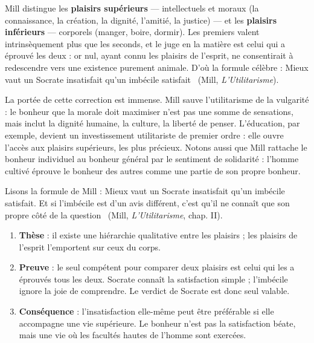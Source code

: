 \documentclass[11pt]{article}
\begin{document}
\begin{propriete}
Mill distingue les \textbf{plaisirs supérieurs} — intellectuels et moraux (la connaissance, la création, la dignité, l'amitié, la justice) — et les \textbf{plaisirs inférieurs} — corporels (manger, boire, dormir). Les premiers valent intrinsèquement plus que les seconds, et le juge en la matière est celui qui a éprouvé les deux : or nul, ayant connu les plaisirs de l'esprit, ne consentirait à redescendre vers une existence purement animale. D'où la formule célèbre : \guillemotleft Mieux vaut un Socrate insatisfait qu'un imbécile satisfait \guillemotright\ (Mill, \emph{L'Utilitarisme}).
\end{propriete}

La portée de cette correction est immense. Mill sauve l'utilitarisme de la vulgarité : le bonheur que la morale doit maximiser n'est pas une somme de sensations, mais inclut la dignité humaine, la culture, la liberté de penser. L'éducation, par exemple, devient un investissement utilitariste de premier ordre : elle ouvre l'accès aux plaisirs supérieurs, les plus précieux. Notons aussi que Mill rattache le bonheur individuel au bonheur général par le sentiment de solidarité : l'homme cultivé éprouve le bonheur des autres comme une partie de son propre bonheur.

\begin{experience}
Lisons la formule de Mill : \guillemotleft Mieux vaut un Socrate insatisfait qu'un imbécile satisfait. Et si l'imbécile est d'un avis différent, c'est qu'il ne connaît que son propre côté de la question \guillemotright\ (Mill, \emph{L'Utilitarisme}, chap. II).
\begin{enumerate}
\item \textbf{Thèse} : il existe une hiérarchie qualitative entre les plaisirs ; les plaisirs de l'esprit l'emportent sur ceux du corps.
\item \textbf{Preuve} : le seul compétent pour comparer deux plaisirs est celui qui les a éprouvés tous les deux. Socrate connaît la satisfaction simple ; l'imbécile ignore la joie de comprendre. Le verdict de Socrate est donc seul valable.
\item \textbf{Conséquence} : l'insatisfaction elle-même peut être préférable si elle accompagne une vie supérieure. Le bonheur n'est pas la satisfaction béate, mais une vie où les facultés hautes de l'homme sont exercées.
\end{enumerate}
\end{experience}
\end{document}
